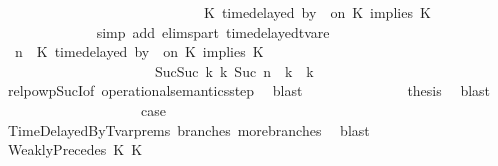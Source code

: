 \begin{isabellebody}
\ \ \ \ \ \ \ \ \ \ \ \ \ \ \ \ \ \ \ \ \ \ \ \ \ \ \ \ {\isasymtriangleright}\ {\isacharparenleft}{\isacharparenleft}K\ time{\isacharminus}delayed{\isasymsharp}\ by\ {\isasymdelta}{\isasymtau}\ on\ K\ implies\ K\ {\isacharhash}\ {\isasymPhi}{\isacharparenright}{\isacharparenright}{\isacartoucheclose}\isanewline
\ \ \ \ \ \ \ \ \ \ \ \ \isamarkupfalse%
\ {\isacharparenleft}simp\ add{\isacharcolon}\ elims{\isacharunderscore}part\ timedelayed{\isacharunderscore}tvar{\isacharunderscore}e{}{\isacharparenright}\isanewline
\ \ \ \ \ \ \ \ \ \ \isamarkupfalse%
\ \isamarkupfalse%
\ {\isacartoucheopen}{\isacharparenleft}{\isasymGamma}{\isacharcomma}\ n\ {\isasymturnstile}\ {\isacharparenleft}{\isacharparenleft}K\ time{\isacharminus}delayed{\isasymsharp}\ by\ {\isasymdelta}{\isasymtau}\ on\ K\ implies\ K\ {\isacharhash}\ {\isasymPsi}{\isacharparenright}\ {\isasymtriangleright}\ {\isasymPhi}{\isacharparenright}\isanewline
\ \ \ \ \ \ \ \ \ \ \ \ \ \ \ \ \ \ \ \ \ \ {\isasymhookrightarrow}\isactrlbsup Suc{\isacharparenleft}Suc\ k{\isacharparenright}\isactrlesup \ {\isacharparenleft}{\isasymGamma}\isactrlsub k{\isacharcomma}\ Suc\ n\ {\isasymturnstile}\ {\isasymPsi}\isactrlsub k\ {\isasymtriangleright}\ {\isasymPhi}\isactrlsub k{\isacharparenright}{\isacartoucheclose}\isanewline
\ \ \ \ \ \ \ \ \ \ \ \ \isamarkupfalse%
\ relpowp{\isacharunderscore}Suc{\isacharunderscore}I{}{\isacharbrackleft}of\ {\isacartoucheopen}operational{\isacharunderscore}semantics{\isacharunderscore}step{\isacartoucheclose}{\isacharbrackright}\ \isamarkupfalse%
\ blast\isanewline
\ \ \ \ \ \ \ \ \ \ \isamarkupfalse%
\ {\isacharasterisk}\ \isamarkupfalse%
\ {\isacharquery}thesis\ \isamarkupfalse%
\ blast\isanewline
\ \ \ \ \ \ \ \ \isamarkupfalse%
\isanewline
\ \ \ \ \ \ \ \ \isamarkupfalse%
\ \isamarkupfalse%
\ {\isacharquery}case\ \isamarkupfalse%
\ TimeDelayedByTvar{\isachardot}prems{\isacharparenleft}{}{\isacharparenright}\ branches\ more{\isacharunderscore}branches\ \isamarkupfalse%
\ blast\isanewline
\ \ \isamarkupfalse%
\isanewline
\ \ \ \ \isamarkupfalse%
\ {\isacharparenleft}WeaklyPrecedes\ K\ K\isanewline

\end{isabellebody}
